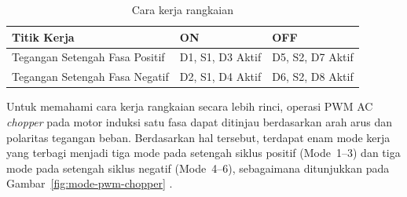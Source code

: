 \begin{table}[H]
\caption{Cara kerja rangkaian}
\centering
\renewcommand{\arraystretch}{1.6}
\begin{tabularx}{\linewidth}{|
  >{\centering\arraybackslash}X|
  >{\centering\arraybackslash}X|
  >{\centering\arraybackslash}X|}
\hline
\textbf{Titik Kerja} & \textbf{ON} & \textbf{OFF} \\
\hline
Tegangan Setengah Fasa Positif & D1, S1, D3 \newline Aktif & D5, S2, D7 \newline Aktif \\
\hline
Tegangan Setengah Fasa Negatif & D2, S1, D4 \newline Aktif & D6, S2, D8 \newline Aktif \\
\hline
\end{tabularx}
\label{tab:ac_chopper_operation}
\end{table}

Untuk memahami cara kerja rangkaian secara lebih rinci, operasi PWM AC
\emph{chopper} pada motor induksi satu fasa dapat ditinjau berdasarkan arah
arus dan polaritas tegangan beban. Berdasarkan hal tersebut, terdapat enam mode
kerja yang terbagi menjadi tiga mode pada setengah siklus positif (Mode~1--3)
dan tiga mode pada setengah siklus negatif (Mode~4--6), sebagaimana ditunjukkan
pada Gambar~\ref{fig:mode-pwm-chopper} \parencite{6523243}.

